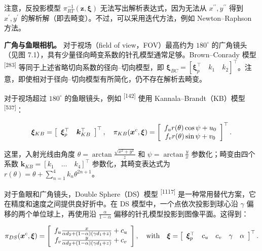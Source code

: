 注意，反投影模型 $\pi _ { R T } ^ { - 1 } ( \boldsymbol {z} , \pmb { \xi } )$ 无法写出解析表达式，因为无法从 $x ^ { \prime \prime }, y ^ { \prime \prime }$ 得到 $x ^ { \prime }, y ^ { \prime }$ 的解析解（即去畸变）。不过，可以采用迭代方法，例如 Newton--Raphson 方法。

\textbf{广角与鱼眼相机。} 对于视场（field of view，FOV）最高约为 $180 ^ { \circ }$ 的广角镜头（见图 7.1），具有少量径向畸变系数的针孔模型通常足够。Brown--Conrady 模型 \textsuperscript{[283]} 等同于上述省略切向系数的径向--切向模型，即 $\boldsymbol {\xi} _ { B C } = [ \pmb { \xi } _ { p } ^ { \top } \quad k _ { 1 } \quad k _ { 2 } ] ^ {\top}$。注意，即使相对于径向--切向模型有所简化，仍不存在解析去畸变。

对于视场超过 $180 ^ { \circ }$ 的鱼眼镜头，例如 \textsuperscript{[142]} 使用 Kannala--Brandt（KB）模型 \textsuperscript{[537]}：

\begin{equation*}
\pmb {\xi} _ {K B} = \left[ \begin{array}{c c} \pmb {\xi} _ {p} ^ {\top} & \pmb {k} _ {K B} ^ {\top} \end{array} \right] ^ {\top}, \quad \pi_ {K B} (\pmb {x} ^ {c}, \pmb {\xi}) = \left[ \begin{array}{c} f _ {u} r (\theta) \cos \psi + u _ {0} \\ f _ {v} r (\theta) \sin \psi + v _ {0} \end{array} \right] ^ {\top}.
\end{equation*}

这里，入射光线由角度 $\theta = \arctan \frac { \sqrt { x ^ { 2 } + y ^ { 2 } } } { z }$ 和 $\psi = \arctan \frac { y } { x }$ 参数化；畸变由四个系数 $\pmb { k } _ { K B } = \left[ k _ { 1 } \quad \ldots \quad k _ { 4 } \right] ^ { \top }$ 参数化，其畸变表达式为 $r ( \theta ) = \theta + \sum _ { n = 1 } ^ { 4 } k _ { n } \theta ^ { 2 n + 1 }$。

对于鱼眼和广角镜头，Double Sphere（DS）模型 \textsuperscript{[1117]} 是一种常用替代方案，它在精度和速度之间提供良好折中。在 DS 模型中，一个点依次投影到球心沿 $\gamma$ 偏移的两个单位球上，再使用沿 $\frac { \alpha } { 1 - \alpha }$ 偏移的针孔模型投影到图像平面。这得到：

\begin{equation*}
\pi_ {D S} (\pmb {x} ^ {c}, \pmb {\xi}) = \left[ \begin{array}{c} f _ {u} \frac {x}{\alpha d _ {2} + (1 - \alpha) (\gamma d _ {1} + z)} + c _ {u} \\ f _ {v} \frac {y}{\alpha d _ {2} + (1 - \alpha) (\gamma d _ {1} + z)} + c _ {v} \end{array} \right], \quad \mathrm{with}\quad \pmb {\xi} = \left[ \begin{array}{c c c c c} \pmb {\xi} _ {p} ^ {\top} & c _ {u} & c _ {v} & \gamma & \alpha \end{array} \right] ^ {\top}.
\end{equation*}

